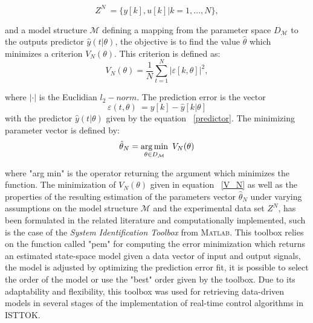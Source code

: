 \begin{equation}
Z^N~= \{y[k],u[k]|k=1,...,N\}, 
\end{equation}
 
 and a model structure $\mathcal{M}$ defining  a mapping from the parameter space $D_{\mathcal{M}}$ to the outputs predictor $\hat{y}(t|\theta)$, the objective is to find the value $\hat{\theta}$ which minimizes a criterion $V_N(\theta)$. This criterion is defined as:
 \begin{equation}
 V_N(\theta)=\frac{1}{N} \sum_{t=1}^{N}|\varepsilon[k,\theta]|^2,
 \label{V_N}
 \end{equation}
 
 where $|\cdot|$ is the Euclidian $l_2-norm$. The prediction error is the vector
 \begin{equation}
 \varepsilon(t,\theta)~=y[k]-\hat{y}[k|\theta]
 \end{equation}
 with the predictor $\hat{y}(t|\theta)$ given by the equation ~\ref{predictor}. The minimizing parameter vector is defined by:
 \begin{equation}
 \hat{\theta}_N=\operatorname*{arg\,min}_{\theta \in D_\mathcal{M}}~V_N(\theta)
 \end{equation}
 
where "arg min" is the operator returning the argument which minimizes the function. The minimization of $V_N(\theta)$ given in equation ~\ref{V_N}  as well as the properties of the resulting estimation of the parameters vector $\hat{\theta}_N$ under varying assumptions on the model structure $\mathcal{M}$ and the experimental data set $Z^N$, has been formulated in the related literature and computationally implemented, such is the case of the \textit{System Identification Toolbox} from \textsc{Matlab}. This toolbox relies on the function called "pem" for computing the error minimization which returns an estimated state-space model given a data vector of input and output signals\cite[Chapter~4]{Toolbox}, the model is adjusted by optimizing the prediction error fit, it is possible to select the order of the model or use the "best" order given by the toolbox. Due to its adaptability and flexibility, this toolbox was used for retrieving data-driven models in several stages of the implementation of real-time control algorithms in ISTTOK.